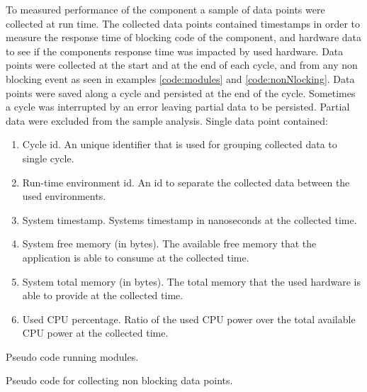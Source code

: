 To measured performance of the component a sample of data points were collected at run time.
The collected data points contained timestamps in order to measure the response time of blocking code of the component, and hardware data to see if the components response time was impacted by used hardware.
Data points were collected at the start and at the end of each cycle, and from any non blocking event as seen in examples \ref{code:modules} and \ref{code:nonNlocking}.
Data points were saved along a cycle and persisted at the end of the cycle.
Sometimes a cycle was interrupted by an error leaving partial data to be persisted.
Partial data were excluded from the sample analysis.
Single data point contained:
\begin{enumerate}
    \item Cycle id. An unique identifier that is used for grouping collected data to single cycle.
    \item Run-time environment id. An id to separate the collected data between the used environments.
    \item System timestamp. Systems timestamp in nanoseconds at the collected time.
    \item System free memory (in bytes). The available free memory that the application is able to consume at the collected time.
    \item System total memory (in bytes). The total memory that the used hardware is able to provide at the collected time.
    \item Used CPU percentage. Ratio of the used CPU power over the total available CPU power at the collected time.
\end{enumerate}
\begin{table}
    
    \caption{Pseudo code running modules.}
    \label{code:modules}
\end{table}
\begin{table}
    
    \caption{Pseudo code for collecting non blocking data points.}
    \label{code:nonNlocking}
\end{table}

